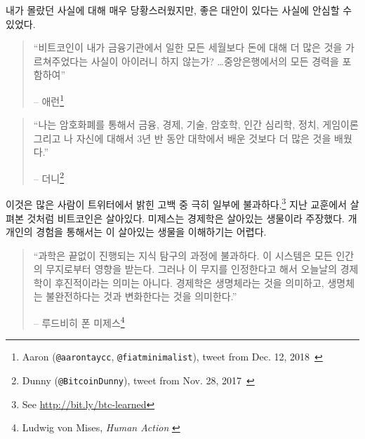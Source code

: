 내가 몰랐던 사실에 대해 매우 당황스러웠지만,
좋은 대안이 있다는 사실에 안심할 수 있었다.

\begin{quotation}\begin{samepage}
\enquote{비트코인이 내가 금융기관에서 일한 모든 세월보다 돈에 대해 더 많은 것을 가르쳐주었다는 사실이 
아이러니 하지 않는가? \ldots 중앙은행에서의 모든 경력을 포함하여}
\begin{flushright} -- 애런\footnote{Aaron (\texttt{@aarontaycc}, \texttt{@fiatminimalist}), tweet from Dec.
12, 2018~\cite{aarontaycc-tweet}}
\end{flushright}\end{samepage}\end{quotation}

\begin{quotation}\begin{samepage}
\enquote{나는 암호화폐를 통해서 금융, 경제, 기술, 암호학, 인간 심리학, 정치, 게임이론 그리고 나 자신에 대해서
	3년 반 동안 대학에서 배운 것보다 더 많은 것을 배웠다.}
\begin{flushright} -- 더니\footnote{Dunny (\texttt{@BitcoinDunny}), tweet from Nov. 28,
2017~\cite{bitcoindunny-tweet}}
\end{flushright}\end{samepage}\end{quotation}

이것은 많은 사람이 트위터에서 밝힌 고백 중 극히 일부에 불과하다.\footnote{See
\url{http://bit.ly/btc-learned}} 
지난 교훈에서 살펴본 것처럼 비트코인은 살아있다. 
미제스는 경제학은 살아있는 생물이라 주장했다. 
개개인의 경험을 통해서는 이 살아있는 생물을 이해하기는 어렵다.

\begin{quotation}\begin{samepage}
\enquote{과학은 끝없이 진행되는 지식 탐구의 과정에 불과하다. 
	이 시스템은 모든 인간의 무지로부터 영향을 받는다. 
	그러나 이 무지를 인정한다고 해서 오늘날의 경제학이 후진적이라는 의미는 아니다.
	경제학은 생명체라는 것을 의미하고, 
	생명체는 불완전하다는 것과 변화한다는 것을 의미한다.}
\begin{flushright} -- 루드비히 폰 미제스\footnote{Ludwig von Mises, \textit{Human Action}
\cite{human-action}}
\end{flushright}\end{samepage}\end{quotation}

